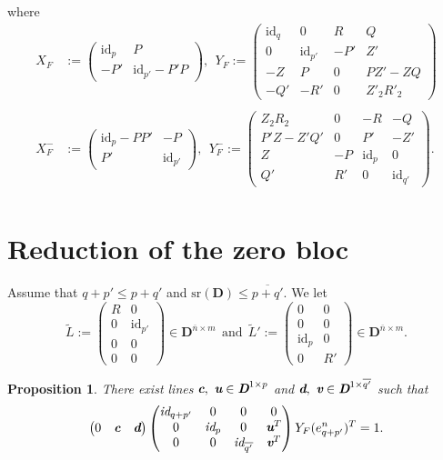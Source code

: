 \documentclass[10pt]{article}
\newtheorem{proposition}{Proposition}
\newcommand\g[1]{\textbf{#1}}
\newcommand\gth[1]{\emph{\g{#1}}}
\newcommand\id[1]{\text{id}_{#1}}
\newcommand\idd[1]{\emph{id}_{#1}}
\newcommand\sr[1]{\text{sr}\left(#1\right)}
\newcommand\D{\g{D}}
\begin{document}
where
\[\begin{split}
X_F&:=\begin{pmatrix}
\id{p} & P\\
-P' & \id{p'}-P'P
\end{pmatrix},\ \
Y_F:=\begin{pmatrix}
\id{q} & 0 & R & Q\\
0 & \id{p'} & -P' & Z'\\
-Z & P & 0 & PZ'-ZQ\\
-Q' & -R' & 0 & Z'_2R'_2
\end{pmatrix}\\
& \\
X_F^-&:=\begin{pmatrix}
\id{p}-PP' & -P\\
P' & \id{p'}
\end{pmatrix},\ \
Y_F^-:=\begin{pmatrix}
Z_2R_2 & 0 & -R & -Q\\
P'Z-Z'Q' & 0 & P' & -Z'\\
Z & -P & \id{p} & 0\\
Q' & R' & 0 & \id{q'}
\end{pmatrix}.\\
\end{split}\]

\section{Reduction of the zero bloc}

Assume that $q+p'\leq p+q'$ and $\sr{\D}\leq\overline{p+q'}$. We let
\[\tilde{L}:=\begin{pmatrix}
R & 0\\
0 & \id{p'}\\
0 & 0\\
0 & 0
\end{pmatrix}\in\D^{\overline{n}\times m}\ \
\text{and}\ \
\tilde{L}':=\begin{pmatrix}
0 & 0\\
0 & 0\\
\id{p} & 0\\
0 & R'
\end{pmatrix}\in\D^{\overline{n}\times m}.\]

\begin{proposition}\label{prop:reduced_Bezout_zero_part}
  There exist lines $\gth{c},\ \gth{u}\in\gth{D}^{1\times p}$ and
  $\gth{d},\ \gth{v}\in\gth{D}^{1\times\overline{q'}}$ such that
  \begin{equation}\label{equ:reduced_Bezout_zero_part}
    \begin{pmatrix}
      0 & \gth{c} & \gth{d}\end{pmatrix}\begin{pmatrix}
      \idd{q+p'} & 0 & 0 & 0\\
      0 & \idd{p} & 0 & \gth{u}^T\\
      0 & 0 & \idd{\overline{q'}} & \gth{v}^T
    \end{pmatrix}Y_F(e^{n}_{q+p'})^T=1.
  \end{equation}

\end{proposition}
\end{document}
